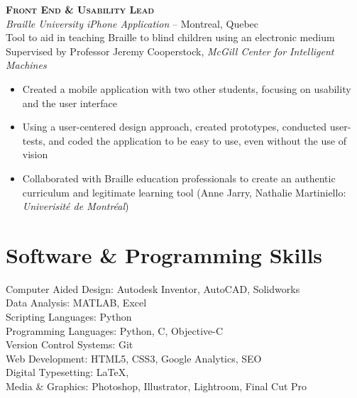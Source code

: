 \documentclass[11pt, letterpaper]{article} %
\newcommand{\years}[1]{\marginnote{\footnotesize #1}} %
\begin{document}
  \begin{samepage}
    \years{1/2013 - 8/2013} \textbf{\scshape Front End \& Usability Lead}\\
    \textit{Braille University iPhone Application} -- Montreal, Quebec\\
    Tool to aid in teaching Braille to blind children using an electronic medium\\ %
    {\small Supervised by Professor Jeremy Cooperstock, \textit {McGill Center for Intelligent Machines}}
      \begin{itemize}
        \item Created a mobile application with two other students, focusing on usability and the user interface
        \item Using a user-centered design approach, created prototypes, conducted user-tests, and coded the application to be easy to use, even without the use of vision
        \item Collaborated with Braille education professionals to create an authentic curriculum and legitimate learning tool (Anne Jarry, Nathalie Martiniello: \textit {Univerisit\'e de Montr\'eal})
      \end{itemize}
  \end {samepage}



\section*{Software \& Programming Skills}
  Computer Aided Design: Autodesk Inventor, AutoCAD, Solidworks\\
  Data Analysis: MATLAB, Excel\\
  Scripting Languages: Python\\
  Programming Languages: Python, C, Objective-C\\
  Version Control Systems: Git\\
  Web Development: HTML5, CSS3, Google Analytics, SEO\\
  Digital Typesetting: \LaTeX, \XeLaTeX \\
  Media \& Graphics: Photoshop, Illustrator, Lightroom, Final Cut Pro
\end{document}
